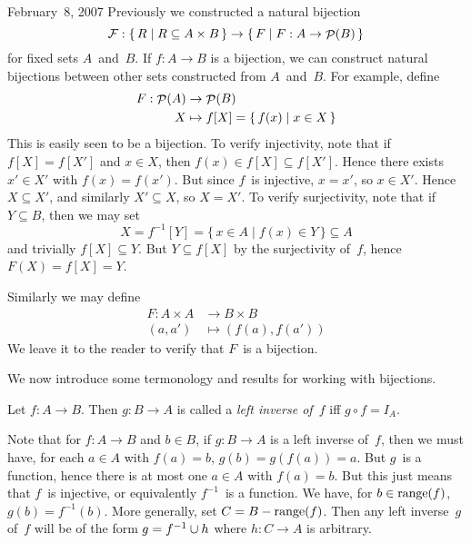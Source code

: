 \begin{lecture}{February~8, 2007}
Previously we constructed a natural bijection
\[\mathcal{F}:\{\,R\mid R\subseteq A\times B\,\}\to\{\,F\mid F:A\to\mathop{\mathcal{P}}(B)\,\}\]
for fixed sets \(A\)~and~\(B\). If \(f:A\to B\) is a bijection, we can construct natural bijections between other sets constructed from \(A\)~and~\(B\). For example, define
\begin{align*}
F:\mathop{\mathcal{P}}(A)&\to\mathop{\mathcal{P}}(B)\\
	X&\mapsto f[X]=\{\,f(x)\mid x\in X\,\}
\end{align*}
This is easily seen to be a bijection. To verify injectivity, note that if \(f[X]=f[X']\) and \(x\in X\), then \(f(x)\in f[X]\subseteq f[X']\). Hence there exists \(x'\in X'\) with \(f(x)=f(x')\). But since \(f\)~is injective, \(x=x'\), so \(x\in X'\). Hence \(X\subseteq X'\), and similarly \(X'\subseteq X\), so \(X=X'\). To verify surjectivity, note that if \(Y\subseteq B\), then we may set
\[X=f^{-1}[Y]=\{\,x\in A\mid f(x)\in Y\,\}\subseteq A\]
and trivially \(f[X]\subseteq Y\). But \(Y\subseteq f[X]\) by the surjectivity of~\(f\), hence \(F(X)=f[X]=Y\).

Similarly we may define
\begin{align*}
F:A\times A&\to B\times B\\
	(a,a')&\mapsto (f(a),f(a'))
\end{align*}
We leave it to the reader to verify that \(F\)~is a bijection.

We now introduce some termonology and results for working with bijections.
\begin{defn}
Let \(f:A\to B\). Then \(g:B\to A\) is called a \emph{left inverse of~\(f\)} iff \(g\circ f=I_A\).
\end{defn}
\noindent Note that for \(f:A\to B\) and \(b\in B\), if \(g:B\to A\) is a left inverse of~\(f\), then we must have, for each \(a\in A\) with \(f(a)=b\), \(g(b)=g(f(a))=a\). But \(g\)~is a function, hence there is at most one \(a\in A\) with \(f(a)=b\). But this just means that \(f\)~is injective, or equivalently \(f^{-1}\)~is a function. We have, for \(b\in\operatorname{range}(f)\), \(g(b)=f^{-1}(b)\). More generally, set \(C=B-\operatorname{range}(f)\). Then any left inverse~\(g\) of~\(f\) will be of the form \(g=f^{-1}\cup h\) where \(h:C\to A\) is arbitrary.


\end{lecture}
